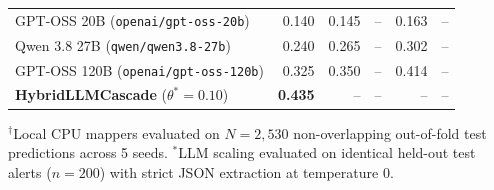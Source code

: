 \begin{table}[t]
\begin{tabular}{lrrrrr}
GPT-OSS 20B (\texttt{openai/gpt-oss-20b}) & 0.140 & 0.145 & -- & 0.163 & -- \\
Qwen 3.8 27B (\texttt{qwen/qwen3.8-27b}) & 0.240 & 0.265 & -- & 0.302 & -- \\
GPT-OSS 120B (\texttt{openai/gpt-oss-120b}) & 0.325 & 0.350 & -- & 0.414 & -- \\
\textbf{HybridLLMCascade} ($\theta^*=0.10$) & \textbf{0.435} & -- & -- & -- & -- \\
\bottomrule
\end{tabular}
\begin{flushleft}\footnotesize
$^{\dagger}$Local CPU mappers evaluated on $N=2{,}530$ non-overlapping out-of-fold test predictions across 5 seeds.
$^{*}$LLM scaling evaluated on identical held-out test alerts ($n=200$) with strict JSON extraction at temperature 0.
\end{flushleft}
\end{table}
